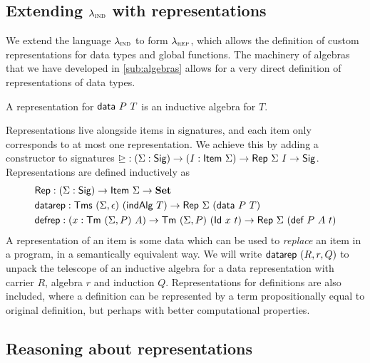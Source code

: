 \subsection{Extending $\lambda_{\textsc{ind}}$ with representations} \label{sub:lambdarep}

We extend the language $\lambda_{\textsc{ind}}$ to form $\lambda_{\textsc{rep}}$, which allows the definition of
custom representations for data types and global functions. The
machinery of algebras that we have developed in \cref{sub:algebras} allows for a
very direct definition of representations of data types.

\begin{definition}
	A representation for $\mta{data}\ P\ T$ is an inductive algebra for $T$.
\end{definition}
Representations live alongside items in signatures, and each item only corresponds
to at most one representation. We achieve this by adding a constructor to signatures
$\unrhd : (\Sigma : \textsf{Sig}) \to (I : \textsf{Item}\ \Sigma) \to \textsf{Rep}\ \Sigma\ I \to \textsf{Sig}$.
Representations are defined inductively as
\begin{align*}
& \Rep : (\Sigma : \Sig) \to \Item\ \Sigma \to \Set \\
& \mta{datarep} : \Tms\ (\Sigma, \epsilon)\ (\mta{indAlg}\ T) \to \Rep\ \Sigma\ (\mta{data}\ P\ T) \\
& \mta{defrep} : (x : \Tm\ (\Sigma, P)\ A) \to \Tm\ (\Sigma, P)\ (\mta{Id}\ x\ t) \to \Rep\ \Sigma\ (\mta{def}\ P\ A\ t)
\end{align*}
A representation of an item is some data which can be used to \emph{replace} an
item in a program, in a semantically equivalent way. We will write
$\mta{datarep}\ (R, r, Q)$ to unpack the telescope of an inductive algebra for a
data representation with carrier $R$, algebra $r$ and induction $Q$.
Representations for definitions are also included, where a definition can be
represented by a term propositionally equal to original definition, but perhaps
with better computational properties.

\subsection{Reasoning about representations} \label{sub:reasoningrep}

